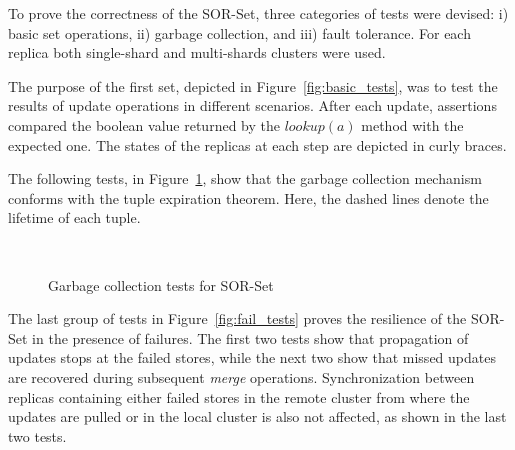 To prove the correctness of the SOR-Set, three categories of tests were devised:
i) basic set operations, ii) garbage collection, and iii) fault tolerance. For each
replica both single-shard and multi-shards clusters were used.

The purpose of the first set, depicted in Figure~\ref{fig:basic_tests}, was
to test the results of update operations in different scenarios. After each
update, assertions compared the boolean value returned by the
$\textit{lookup}(a)$ method with the expected one. The states of the replicas at
each step are depicted in curly braces.

The following tests, in Figure~\ref{fig:gc_tests}, show that the garbage
collection mechanism conforms with the tuple expiration theorem. Here, the
dashed lines denote the lifetime of each tuple.

\begin{figure}[t]
  \noindent
  \centering
  \qquad
  \\ \vspace*{1.5em}
  \qquad
\caption{Garbage collection tests for SOR-Set}
\label{fig:gc_tests}
\end{figure}

The last group of tests in Figure~\ref{fig:fail_tests} proves the resilience
of the SOR-Set in the presence of failures. The first two tests show that
propagation of updates stops at the failed stores, while the next two show that
missed updates are recovered during subsequent \textit{merge} operations.
Synchronization between replicas containing either failed stores in the remote
cluster from where the updates are pulled or in the local cluster is also
not affected, as shown in the last two tests.


